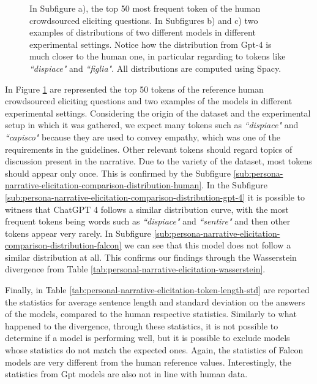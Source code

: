 \begin{figure}[!htbp]
    \caption{In Subfigure a), the top 50 most frequent token of the human crowdsourced eliciting questions. In Subfigures b) and c) two examples of distributions of two different models in different experimental settings. Notice how the distribution from Gpt-4 is much closer to the human one, in particular regarding to tokens like \emph{``dispiace"} and \emph{``figlia"}. All distributions are computed using Spacy.}
    \label{fig:persona-narrative-elicitation-comparison-distribution}
\end{figure}

In Figure \ref{fig:persona-narrative-elicitation-comparison-distribution} are represented the top 50 tokens of the reference human crowdsourced eliciting questions and two examples of the models in different experimental settings. Considering the origin of the dataset and the experimental setup in which it was gathered, we expect many tokens such as \emph{``dispiace"} and \emph{``capisco"} because they are used to convey empathy, which was one of the requirements in the guidelines. Other relevant tokens should regard topics of discussion present in the narrative. Due to the variety of the dataset, most tokens should appear only once. This is confirmed by the Subfigure \ref{sub:persona-narrative-elicitation-comparison-distribution-human}. 
In the Subfigure \ref{sub:persona-narrative-elicitation-comparison-distribution-gpt-4} it is possible to witness that ChatGPT 4 follows a similar distribution curve, with the most frequent tokens being words such as \emph{``dispiace"} and \emph{``sentire"} and then other tokens appear very rarely. 
In Subfigure \ref{sub:persona-narrative-elicitation-comparison-distribution-falcon} we can see that this model does not follow a similar distribution at all. This confirms our findings through the Wasserstein divergence from Table \ref{tab:personal-narrative-elicitation-wasserstein}.

% 
Finally, in Table \ref{tab:personal-narrative-elicitation-token-length-std} are reported the statistics for average sentence length and standard deviation on the answers of the models, compared to the human respective statistics. Similarly to what happened to the divergence, through these statistics, it is not possible to determine if a model is performing well, but it is possible to exclude models whose statistics do not match the expected ones. Again, the statistics of Falcon models are very different from the human reference values. Interestingly, the statistics from Gpt models are also not in line with human data. 

